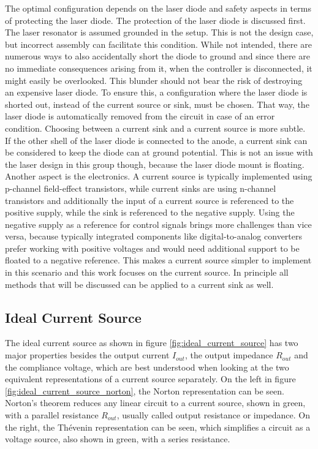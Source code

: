 The optimal configuration depends on the laser diode and safety aspects in terms of protecting the laser diode. The protection of the laser diode is discussed first. The laser resonator is assumed grounded in the setup. This is not the design case, but incorrect assembly can facilitate this condition. While not intended, there are numerous ways to also accidentally short the diode to ground and since there are no immediate consequences arising from it, when the controller is disconnected, it might easily be overlooked. This blunder should not bear the risk of destroying an expensive laser diode. To ensure this, a configuration where the laser diode is shorted out, instead of the current source or sink, must be chosen. That way, the laser diode is automatically removed from the circuit in case of an error condition.
Choosing between a current sink and a current source is more subtle. If the other shell of the laser diode is connected to the anode, a current sink can be considered to keep the diode can at ground potential. This is not an issue with the laser design in this group though, because the laser diode mount is floating. Another aspect is the electronics. A current source is typically implemented using p-channel field-effect transistors, while current sinks are using n-channel transistors and additionally the input of a current source is referenced to the positive supply, while the sink is referenced to the negative supply. Using the negative supply as a reference for control signals brings more challenges than vice versa, because typically integrated components like digital-to-analog converters prefer working with positive voltages and would need additional support to be floated to a negative reference. This makes a current source simpler to implement in this scenario and this work focuses on the current source. In principle all methods that will be discussed can be applied to a current sink as well.

\subsection{Ideal Current Source}
The ideal current source as shown in figure \ref{fig:ideal_current_source} has two major properties besides the output current $I_{out}$, the output impedance $R_{out}$ and the compliance voltage, which are best understood when looking at the two equivalent representations of a current source separately. On the left in figure \ref{fig:ideal_current_source_norton}, the Norton representation can be seen. Norton's theorem reduces any linear circuit to a current source, shown in green, with a parallel resistance $R_{out}$, usually called output resistance or impedance. On the right, the Thévenin representation can be seen, which simplifies a circuit as a voltage source, also shown in green, with a series resistance.


